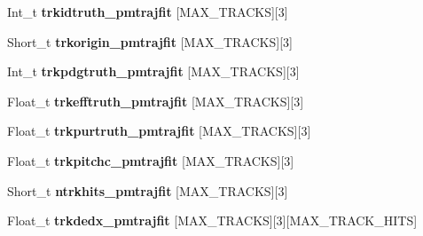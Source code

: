 \begin{DoxyCompactItemize}
\item 
\hypertarget{classanatree_a15ca95c148917641a77bb2a425aa1fcd}{Int\-\_\-t {\bfseries trkidtruth\-\_\-pmtrajfit} \mbox{[}M\-A\-X\-\_\-\-T\-R\-A\-C\-K\-S\mbox{]}\mbox{[}3\mbox{]}}\label{classanatree_a15ca95c148917641a77bb2a425aa1fcd}

\item 
\hypertarget{classanatree_a9cfd1951a32ba252337ce500104ae6cc}{Short\-\_\-t {\bfseries trkorigin\-\_\-pmtrajfit} \mbox{[}M\-A\-X\-\_\-\-T\-R\-A\-C\-K\-S\mbox{]}\mbox{[}3\mbox{]}}\label{classanatree_a9cfd1951a32ba252337ce500104ae6cc}

\item 
\hypertarget{classanatree_a612ea721fc3c57404dd6b15a4b0b6f76}{Int\-\_\-t {\bfseries trkpdgtruth\-\_\-pmtrajfit} \mbox{[}M\-A\-X\-\_\-\-T\-R\-A\-C\-K\-S\mbox{]}\mbox{[}3\mbox{]}}\label{classanatree_a612ea721fc3c57404dd6b15a4b0b6f76}

\item 
\hypertarget{classanatree_a43587625e0267ff4e395f1856996abd5}{Float\-\_\-t {\bfseries trkefftruth\-\_\-pmtrajfit} \mbox{[}M\-A\-X\-\_\-\-T\-R\-A\-C\-K\-S\mbox{]}\mbox{[}3\mbox{]}}\label{classanatree_a43587625e0267ff4e395f1856996abd5}

\item 
\hypertarget{classanatree_acfc40e8430e7b9cdd1f23e44029897c9}{Float\-\_\-t {\bfseries trkpurtruth\-\_\-pmtrajfit} \mbox{[}M\-A\-X\-\_\-\-T\-R\-A\-C\-K\-S\mbox{]}\mbox{[}3\mbox{]}}\label{classanatree_acfc40e8430e7b9cdd1f23e44029897c9}

\item 
\hypertarget{classanatree_a72abc2ae37be9e5f08f59588515e4453}{Float\-\_\-t {\bfseries trkpitchc\-\_\-pmtrajfit} \mbox{[}M\-A\-X\-\_\-\-T\-R\-A\-C\-K\-S\mbox{]}\mbox{[}3\mbox{]}}\label{classanatree_a72abc2ae37be9e5f08f59588515e4453}

\item 
\hypertarget{classanatree_a14cddd686ef1522843822efe5bf97f59}{Short\-\_\-t {\bfseries ntrkhits\-\_\-pmtrajfit} \mbox{[}M\-A\-X\-\_\-\-T\-R\-A\-C\-K\-S\mbox{]}\mbox{[}3\mbox{]}}\label{classanatree_a14cddd686ef1522843822efe5bf97f59}

\item 
\hypertarget{classanatree_a0cc5a69f4fbc0a37f485ebc28bbbcc80}{Float\-\_\-t {\bfseries trkdedx\-\_\-pmtrajfit} \mbox{[}M\-A\-X\-\_\-\-T\-R\-A\-C\-K\-S\mbox{]}\mbox{[}3\mbox{]}\mbox{[}M\-A\-X\-\_\-\-T\-R\-A\-C\-K\-\_\-\-H\-I\-T\-S\mbox{]}}\label{classanatree_a0cc5a69f4fbc0a37f485ebc28bbbcc80}


\end{DoxyCompactItemize}
